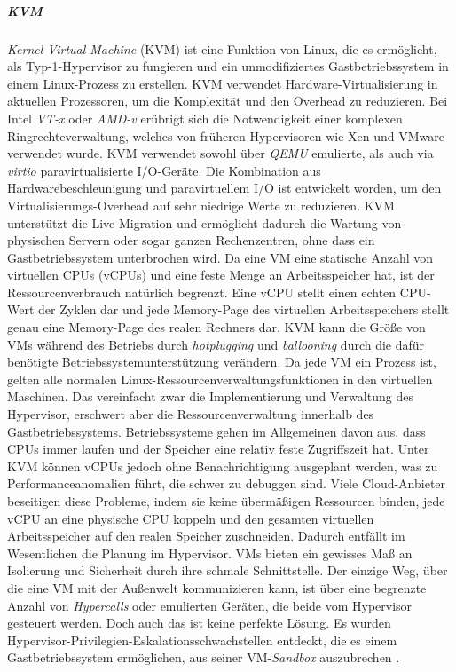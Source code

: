\subparagraph{KVM}
\emph{Kernel Virtual Machine} (KVM) ist eine Funktion von Linux, die es ermöglicht, als Typ-1-Hypervisor zu fungieren und ein unmodifiziertes Gastbetriebssystem in einem Linux-Prozess zu erstellen. KVM verwendet Hardware-Virtualisierung in aktuellen Prozessoren, um die Komplexität und den Overhead zu reduzieren. Bei Intel \emph{VT-x} oder \emph{AMD-v} erübrigt sich die Notwendigkeit einer komplexen Ringrechteverwaltung, welches von früheren Hypervisoren wie Xen und VMware verwendet wurde. KVM verwendet sowohl über \emph{QEMU} \cite{QEMUEmulator} emulierte, als auch via \emph{virtio} \cite{View2018VirtioVirtio} paravirtualisierte I/O-Geräte. Die Kombination aus Hardwarebeschleunigung und paravirtuellem I/O ist entwickelt worden, um den Virtualisierungs-Overhead auf sehr niedrige Werte zu reduzieren. KVM unterstützt die Live-Migration und ermöglicht dadurch die Wartung von physischen Servern oder sogar ganzen Rechenzentren, ohne dass ein Gastbetriebssystem unterbrochen wird. Da eine VM eine statische Anzahl von virtuellen CPUs (vCPUs) und eine feste Menge an Arbeitsspeicher hat, ist der Ressourcenverbrauch natürlich begrenzt. Eine vCPU stellt einen echten CPU-Wert der Zyklen dar und jede Memory-Page des virtuellen Arbeitsspeichers stellt genau eine Memory-Page des realen Rechners dar. KVM kann die Größe von VMs während des Betriebs durch \emph{hotplugging} und \emph{ballooning} durch die dafür benötigte Betriebssystemunterstützung verändern. Da jede VM ein Prozess ist, gelten alle normalen Linux-Ressourcenverwaltungsfunktionen in den virtuellen Maschinen. Das vereinfacht zwar die Implementierung und Verwaltung des Hypervisor, erschwert aber die Ressourcenverwaltung innerhalb des Gastbetriebssystems. Betriebssysteme gehen im Allgemeinen davon aus, dass CPUs immer laufen und der Speicher eine relativ feste Zugriffszeit hat. Unter KVM können vCPUs jedoch ohne Benachrichtigung ausgeplant werden, was zu Performanceanomalien führt, die schwer zu debuggen sind. Viele Cloud-Anbieter beseitigen diese Probleme, indem sie keine übermäßigen Ressourcen binden, jede vCPU an eine physische CPU koppeln und den gesamten virtuellen Arbeitsspeicher auf den realen Speicher zuschneiden. Dadurch entfällt im Wesentlichen die Planung im Hypervisor. VMs bieten ein gewisses Maß an Isolierung und Sicherheit durch ihre schmale Schnittstelle. Der einzige Weg, über die eine VM mit der Außenwelt kommunizieren kann, ist über eine begrenzte Anzahl von \emph{Hypercalls} oder emulierten Geräten, die beide vom Hypervisor gesteuert werden. Doch auch das ist keine perfekte Lösung. Es wurden Hypervisor-Privilegien-Eskalationsschwachstellen entdeckt, die es einem Gastbetriebssystem ermöglichen, aus seiner VM-\emph{Sandbox} auszubrechen \cite{Felter2014IBMContainers}.

